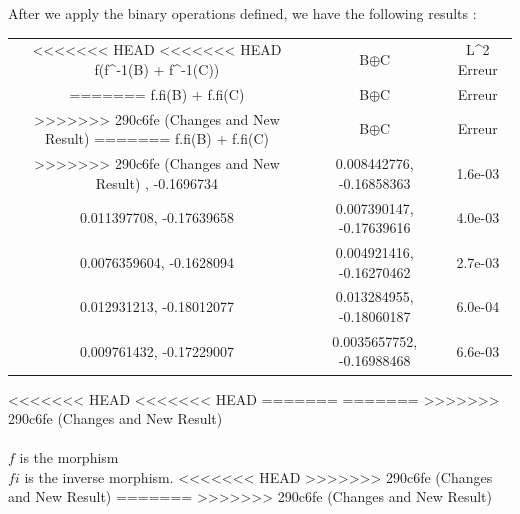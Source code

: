 \documentclass{report}
\begin{document}

            \newpage
            After we apply the binary operations defined, we have the following results :\\

            \begin{tabular}{|c|c|c|}
                \hline
<<<<<<< HEAD
<<<<<<< HEAD
                f(f^{-1}(B) + f^{-1}(C)) & B$\oplus$C & L^2 Erreur  \\
=======
                f.fi(B) + f.fi(C) & B$\oplus$C & Erreur \\
>>>>>>> 290c6fe (Changes and New Result)
=======
                f.fi(B) + f.fi(C) & B$\oplus$C & Erreur \\
>>>>>>> 290c6fe (Changes and New Result)
                \hline
                0.009636102, -0.1696734 & 0.008442776, -0.16858363 & 1.6e-03 \\
                0.011397708, -0.17639658 & 0.007390147, -0.17639616 & 4.0e-03 \\
                0.0076359604, -0.1628094 & 0.004921416, -0.16270462 & 2.7e-03 \\
                0.012931213, -0.18012077 & 0.013284955, -0.18060187 & 6.0e-04 \\
                0.009761432, -0.17229007 & 0.0035657752, -0.16988468 & 6.6e-03 \\
                \hline
            \end{tabular}
<<<<<<< HEAD
<<<<<<< HEAD
=======
=======
>>>>>>> 290c6fe (Changes and New Result)
            \\
            \\
            $f$ is the morphism \\
            $fi$ is the inverse morphism.
<<<<<<< HEAD
>>>>>>> 290c6fe (Changes and New Result)
=======
>>>>>>> 290c6fe (Changes and New Result)
\end{document}
